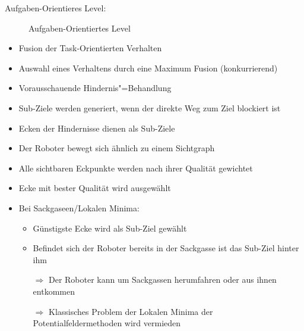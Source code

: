 Aufgaben-Orientieres Level:
\begin{figure}
	\centering
	\caption{Aufgaben-Orientiertes Level}
	\label{ch:08:fig:aufgaben-orientiert}
\end{figure}
\begin{itemize}
	\item Fusion der Task-Orientierten Verhalten
	\item Auswahl eines Verhaltens durch eine Maximum Fusion (konkurrierend)
	\item Vorausschauende Hindernis"=Behandlung
	\item Sub-Ziele werden generiert, wenn der direkte Weg zum Ziel blockiert ist
	\item Ecken der Hindernisse dienen als Sub-Ziele
	\item Der Roboter bewegt sich ähnlich zu einem Sichtgraph
	\item Alle sichtbaren Eckpunkte werden nach ihrer Qualität gewichtet
	\item Ecke mit bester Qualität wird ausgewählt
	\item Bei Sackgaseen/Lokalen Minima:
	\begin{itemize}
		\item Günstigste Ecke wird als Sub-Ziel gewählt
		\item Befindet sich der Roboter bereits in der Sackgasse ist das Sub-Ziel hinter ihm
		\item[$\Rightarrow$] Der Roboter kann um Sackgassen herumfahren oder aus ihnen entkommen
		\item[$\Rightarrow$] Klassisches Problem der Lokalen Minima der Potentialfeldermethoden wird vermieden
	\end{itemize}
\end{itemize}

